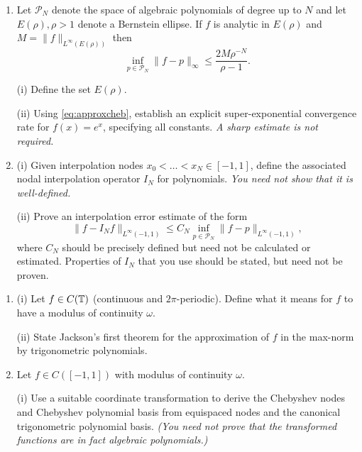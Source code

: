 \documentclass{exams}
\begin{document}
\begin{examcomp1}
\begin{question}
\begin{enumerate}
  \item Let $\mathcal{P}_N$ denote the space of algebraic polynomials of degree
  up to $N$ and let $E(\rho), \rho > 1$ denote a Bernstein ellipse. If $f$ is
  analytic in $E(\rho)$ and $M = \|f\|_{L^\infty(E(\rho))}$ then  
  \begin{equation} \label{eq:approxcheb}
    \inf_{p \in \mathcal{P}_N} \|f - p\|_\infty \leq \frac{2 M \rho^{-N}}{\rho-1}.
  \end{equation}
  
  (i) Define the set $E(\rho)$. 

  (ii) Using \eqref{eq:approxcheb}, establish an explicit super-exponential 
  convergence rate for $f(x) = e^x$, specifying all constants. {\it A 
  sharp estimate is not required.} 

  \item (i) Given interpolation nodes $x_0 < \dots < x_N \in [-1,1]$, define the
  associated nodal interpolation operator $I_N$ for polynomials. {\it You need 
  not show that it is well-defined.}  

  (ii) Prove an interpolation error estimate of the form  
  \[
    \|f - I_N f \|_{L^\infty(-1,1)} \leq C_N 
     \inf_{p \in \mathcal{P}_N} \|f - p\|_{L^\infty(-1,1)},
  \]
  where $C_N$ should be precisely defined but need not 
  be calculated or estimated. Properties of $I_N$ that you 
  use should be stated, but need not be proven.
  \end{enumerate}
\end{question}

\clearpage

\begin{question}
  \begin{enumerate}

  \item (i) Let $f \in C(\mathbb{T})$ (continuous and $2\pi$-periodic). 
  Define what it means for $f$ to have a modulus of continuity $\omega$. 

  (ii) State Jackson's first theorem for the approximation of $f$ in the
  max-norm by trigonometric polynomials.  

  \item Let $f \in C([-1,1])$ with modulus of continuity $\omega$.
  
  (i) Use a suitable coordinate transformation to derive the Chebyshev nodes 
  and Chebyshev polynomial basis from equispaced nodes and the canonical trigonometric 
  polynomial basis. {\it (You need not prove that the transformed 
  functions are in fact algebraic polynomials.)}  
  

\end{enumerate}
\end{question}
\end{examcomp1}
\end{document}
